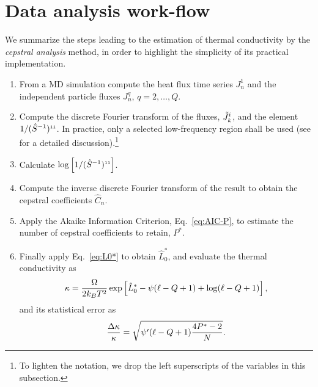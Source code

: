 \section{Data analysis work-flow}
We summarize the steps leading to the estimation of thermal conductivity by the \textit{cepstral analysis} method, in order to highlight the simplicity of its practical implementation.
\begin{enumerate}
\item From a MD simulation compute the heat flux time series $J_n^1$ and the independent particle fluxes $J_n^q$, $q=2,\dots,Q$.
\item Compute the discrete Fourier transform of the fluxes, $\tilde{J}^{\small i}_k$, and the element $1/(\hat{S}^{-1})^{{\scriptscriptstyle 1}{\scriptscriptstyle 1}}$. In practice, only a selected low-frequency region shall be used (see \cite{Ercole2017} for a detailed discussion).\footnote{To lighten the notation, we drop the left superscripts of the variables in this subsection.}
\item Calculate $\log\left[1/(\hat{S}^{-1})^{{\scriptscriptstyle 1}{\scriptscriptstyle 1}}\right]$.
\item Compute the inverse discrete Fourier transform of the result to obtain the cepstral coefficients $\hat{C}_n$.
\item Apply the Akaike Information Criterion, Eq.~\eqref{eq:AIC-P}, to estimate the number of cepstral coefficients to retain, $P^*$.
\item Finally apply Eq.~\eqref{eq:L0*} to obtain $\hat{L}_0^*$, and evaluate the thermal conductivity as
\begin{equation}
\kappa = \frac{{\mathrm\Omega}}{2k_B T^2} \exp\left[\hat{L}_0^* - \psi(\ell - Q+1) + \log(\ell -Q+1) \right],
\end{equation}
and its statistical error as
\begin{equation}
\frac{{\mathrm\Delta}\kappa}{\kappa} = \sqrt{\psi'(\ell -Q+1) \frac{4P^{*}-2}{N}}.
\end{equation}
\end{enumerate}
